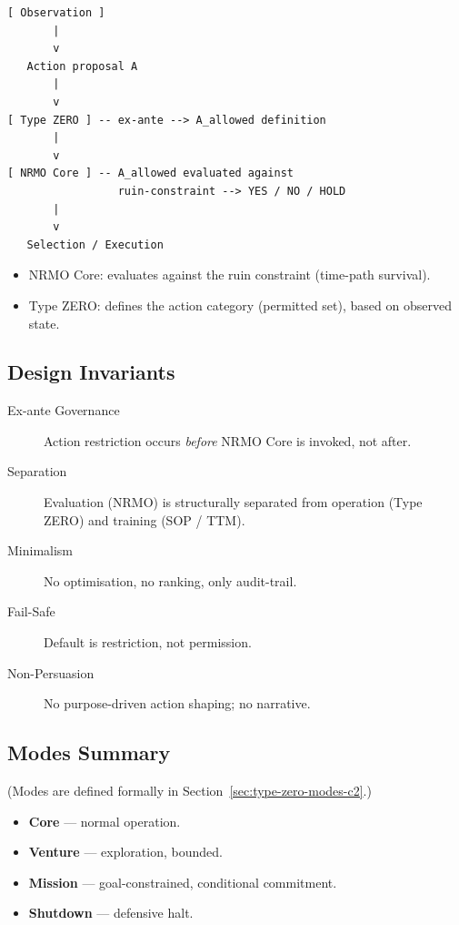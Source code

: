 \begin{lstlisting}[basicstyle=\ttfamily\small,frame=single]
[ Observation ]
       |
       v
   Action proposal A
       |
       v
[ Type ZERO ] -- ex-ante --> A_allowed definition
       |
       v
[ NRMO Core ] -- A_allowed evaluated against
                 ruin-constraint --> YES / NO / HOLD
       |
       v
   Selection / Execution
\end{lstlisting}

\begin{itemize}
\item NRMO Core: evaluates against the ruin constraint (time-path
survival).
\item Type ZERO: defines the action category (permitted set), based
on observed state.
\end{itemize}

\subsection{Design Invariants}
\label{sec:def-offense-design-invariants}

\begin{description}
\item[Ex-ante Governance] Action restriction occurs \emph{before}
NRMO Core is invoked, not after.
\item[Separation] Evaluation (NRMO) is structurally separated from
operation (Type ZERO) and training (SOP / TTM).
\item[Minimalism] No optimisation, no ranking, only audit-trail.
\item[Fail-Safe] Default is restriction, not permission.
\item[Non-Persuasion] No purpose-driven action shaping; no
narrative.
\end{description}

\subsection{Modes Summary}
\label{sec:def-offense-modes}

(Modes are defined formally in
Section~\ref{sec:type-zero-modes-c2}.)

\begin{itemize}
\item \textbf{Core} --- normal operation.
\item \textbf{Venture} --- exploration, bounded.
\item \textbf{Mission} --- goal-constrained, conditional commitment.
\item \textbf{Shutdown} --- defensive halt.
\end{itemize}

